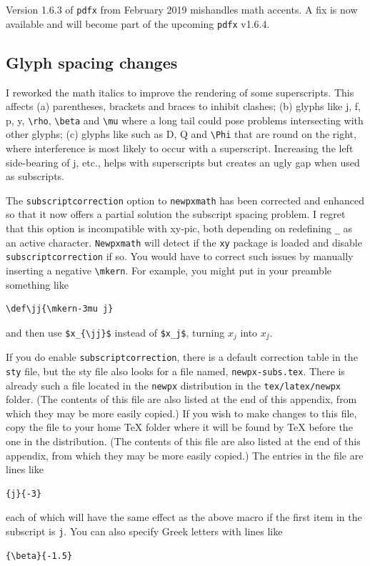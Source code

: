 \documentclass[11pt]{article}
\theoremstyle{oldplain}
\theoremstyle{plain}
\begin{document}
Version 1.6.3 of {\tt pdfx} from February 2019  mishandles math accents. A fix is now available and will become part of the upcoming {\tt pdfx} v1.6.4.

\subsection{Glyph spacing changes} I reworked the math italics to improve the rendering of some  superscripts. This affects (a)  parentheses, brackets and braces to inhibit clashes; (b) glyphs like j, f, p, y, \verb|\rho|,  \verb|\beta| and  \verb|\mu| where a long tail could pose problems intersecting with other glyphs; (c) glyphs like such as D, Q and \verb|\Phi| that are round on the right, where interference is most likely to occur with a superscript. Increasing the left side-bearing of j, etc., helps with superscripts but creates an ugly gap when used as subscripts.  


 The {\tt subscriptcorrection} option to {\tt newpxmath} has been corrected and enhanced  so that it now offers a partial solution the subscript spacing problem. I regret that this option is incompatible with xy-pic, both depending on redefining \verb|_| as an active character. {\tt Newpxmath}  will detect if the {\tt xy} package is loaded and disable {\tt subscriptcorrection} if so. You would have to correct such issues by manually inserting a negative \verb|\mkern|. For example, you might put in your preamble something like
 \begin{verbatim}
\def\jj{\mkern-3mu j}
\end{verbatim}
and then use \verb|$x_{\jj}$| instead of \verb|$x_j$|, turning $x_j$ into $x_{\jj}$.

If you do enable {\tt subscriptcorrection}, there is a default correction table in the {\tt sty} file, but the sty file also looks for a file named,  {\tt newpx-subs.tex}. There is already such a file located in the {\tt newpx} distribution in the \verb|tex/latex/newpx| folder. (The contents of this file are also listed at the end of this appendix, from which they may be more easily copied.) If you wish to make changes to this file, copy the file to your home TeX folder where it will be found by TeX before the one in the distribution. (The contents of this file are also listed at the end of this appendix, from which they may be more easily copied.) The entries in the file are lines like
\begin{verbatim}
{j}{-3}
\end{verbatim}
each of which will have the same effect as the above macro if the first item in the subscript is {\tt j}. You can also specify Greek letters with lines like
\begin{verbatim}
{\beta}{-1.5}
\end{verbatim}
\end{document}
